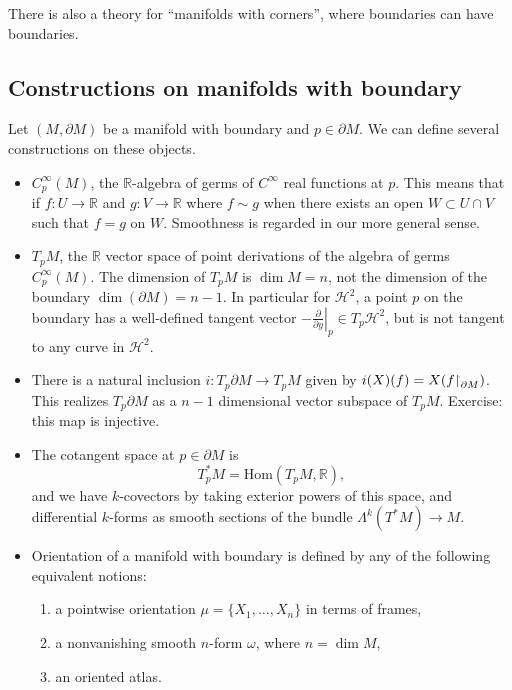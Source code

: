 There is also a theory for ``manifolds with corners'', where
boundaries can have boundaries.

\subsection{Constructions on manifolds with boundary}

Let $(M, \partial M)$ be a manifold with boundary and $p \in \partial
M$. We can define several constructions on these objects.
\begin{itemize}
  \item{
    $C_p^\infty(M)$, the $\mathbb{R}$-algebra of germs of $C^\infty$
    real functions at $p$. This means that if
    $f: U \to \mathbb{R}$ and $g: V \to \mathbb{R}$ where $f \sim g$
    when there exists an open $W \subset U \cap V$ such that $f = g$
    on $W$. Smoothness is regarded in our more general sense.
  }
  \item{
    $T_pM$, the $\mathbb{R}$ vector space of point derivations of the
    algebra of germs $C_p^\infty(M)$. The dimension of $T_p M$ is
    $\dim M = n$, not the dimension of the boundary
    $\dim (\partial M) = n - 1$. In particular for $\mathcal{H}^2$, a
    point $p$ on the boundary has a well-defined tangent vector
    $-\left.\frac{\partial}{\partial y}\right|_p \in T_p
    \mathcal{H}^2$, but is not tangent to any curve in $\mathcal{H}^2$.
  }
  \item{
    There is a natural inclusion
    $i: T_p \partial M \to T_p M$ given by
    $i(X)(f) = X(f\mathord{\upharpoonright}_{\partial M})$. This realizes
    $T_p \partial M$ as a $n-1$ dimensional vector subspace of $T_p
    M$.
    Exercise: this map is injective.
  }
  \item{
    The cotangent space at $p \in \partial M$ is
    $$
    T_p^\ast M = \mathrm{Hom}(T_p M, \mathbb{R}),
    $$
    and we have $k$-covectors by taking exterior powers of this space,
    and differential $k$-forms as smooth sections of the bundle
    $\Lambda^k(T^\ast M) \to M$.
  }
  \item{
    Orientation of a manifold with boundary is defined by any of the
    following equivalent notions:
    \begin{enumerate}
      \item{
        a pointwise orientation $\mu = \{X_1, \dots, X_n\}$ in terms
        of frames,
      }
      \item{
        a nonvanishing smooth $n$-form $\omega$, where $n = \dim M$,
      }
      \item{
        an oriented atlas.
      }
    \end{enumerate}
  }
\end{itemize}

